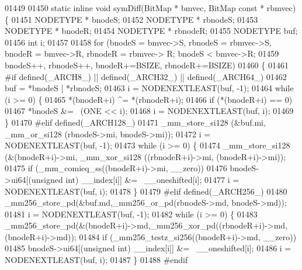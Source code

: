 \begin{DoxyCode}
{01449 
01450 \textcolor{keyword}{static} \textcolor{keyword}{inline} \textcolor{keywordtype}{void} symDiff(BitMap * bmvec, BitMap \textcolor{keyword}{const} * rbmvec) \{
01451         NODETYPE * bnodeS;
01452         NODETYPE * rbnodeS;
01453         NODETYPE * bnodeR;
01454         NODETYPE * rbnodeR;
01455         NODETYPE buf;
01456         \textcolor{keywordtype}{int} i;
01457 
01458         \textcolor{keywordflow}{for} (bnodeS = bmvec->S, rbnodeS = rbmvec->S, bnodeR = bmvec->R, rbnodeR = rbmvec->
      R; bnodeS < bmvec->R;
01459                         bnodeS++, rbnodeS++, bnodeR+=BSIZE, rbnodeR+=BSIZE)
01460         \{
01461 \textcolor{preprocessor}{#if defined(\_ARCH8\_) || defined(\_ARCH32\_) || defined(\_ARCH64\_)}
01462                 buf = *bnodeS | *rbnodeS;
01463                 i = NODENEXTLEAST(buf, -1);
01464                 \textcolor{keywordflow}{while} (i >= 0) \{
01465                         *(bnodeR+i) ^= *(rbnodeR+i);
01466                         \textcolor{keywordflow}{if} (*(bnodeR+i) == 0)
01467                                 *bnodeS &= ~(ONE << i);
01468                         i = NODENEXTLEAST(buf, i);
01469                 \}
01470 \textcolor{preprocessor}{#elif defined(\_ARCH128\_)}
01471                 \_mm\_store\_si128 (&buf.mi, \_mm\_or\_si128 (rbnodeS->mi, bnodeS->mi));
01472                 i = NODENEXTLEAST(buf, -1);
01473                 \textcolor{keywordflow}{while} (i >= 0) \{
01474                         \_mm\_store\_si128 (&(bnodeR+i)->mi, \_mm\_xor\_si128 ((rbnodeR+i)->mi, (bnodeR+i)->mi));
01475                         \textcolor{keywordflow}{if} (\_mm\_comieq\_ss((bnodeR+i)->mi, \_\_zero))
01476                                 bnodeS->ui64[(\textcolor{keywordtype}{unsigned} int) \_\_index[i]] &= ~\_\_oneshifted[i];
01477                         i = NODENEXTLEAST(buf, i);
01478                 \}
01479 \textcolor{preprocessor}{#elif defined(\_ARCH256\_)}
01480                 \_mm256\_store\_pd(&buf.md,\_mm256\_or\_pd(rbnodeS->md, bnodeS->md));
01481                 i = NODENEXTLEAST(buf, -1);
01482                 \textcolor{keywordflow}{while} (i >= 0) \{
01483                         \_mm256\_store\_pd(&(bnodeR+i)->md,\_mm256\_xor\_pd((rbnodeR+i)->md, (bnodeR+i)->md));
01484                         \textcolor{keywordflow}{if} (\_mm256\_testz\_si256((bnodeR+i)->md, \_\_zero))
01485                                 bnodeS->ui64[(\textcolor{keywordtype}{unsigned} int) \_\_index[i]] &= ~\_\_oneshifted[i];
01486                         i = NODENEXTLEAST(buf, i);
01487                 \}
01488 \textcolor{preprocessor}{#endif}
}
\end{DoxyCode}
